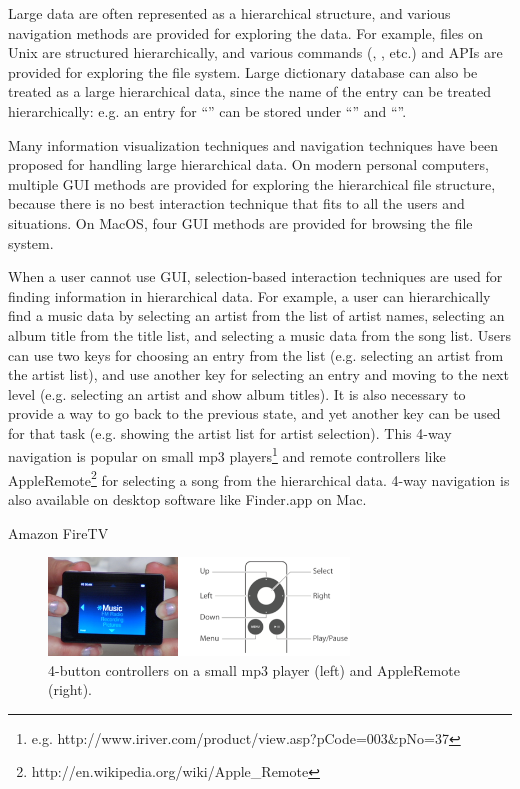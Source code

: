 \documentclass{article}
\begin{document}
Large data are often represented as a hierarchical structure, and
various navigation methods are provided for exploring the data.
For example, files on Unix are structured hierarchically, and
various commands (, , etc.) and APIs are provided for exploring the file system.
Large dictionary database can also be treated as a large
hierarchical data, since the name of the entry can be treated hierarchically:
e.g. an entry for ``'' can be stored under ``'' and ``''.

Many information visualization techniques and navigation techniques
have been proposed for handling large hierarchical data.
On modern personal computers,
multiple GUI methods are provided for
exploring the hierarchical file structure, because
there is no best interaction technique that fits to all the users and situations.
On MacOS, four GUI methods are provided for browsing the file system.


When a user cannot use GUI,
selection-based interaction techniques are used for
finding information in hierarchical data.
For example, a user can hierarchically find a music data by
selecting an artist from the list of artist names,
selecting an album title from the title list,
and selecting a music data from the song list.
Users can use two keys for choosing an entry from the list
(e.g. selecting an artist from the artist list),
and use another key for selecting an entry and moving to the next level
(e.g. selecting an artist and show album titles).
It is also necessary to provide a way to go back to the previous state, and
yet another key can be used for that task
(e.g. showing the artist list for artist selection).
This 4-way navigation is popular on small mp3 players\footnote{
  e.g. \textsf{http://www.iriver.com/product/view.asp?pCode=003\&pNo=37}
} and remote controllers like AppleRemote\footnote{\textsf{http://en.wikipedia.org/wiki/Apple\_Remote}}
for selecting a song from the hierarchical data.
4-way navigation is also available on desktop software like Finder.app on Mac.

Amazon FireTV

\begin{figure}[H]
\centerline{\includegraphics[width=80mm,bb=0 0 547 179]{figures/4buttons.png}}
\caption{4-button controllers on a small mp3 player (left) and AppleRemote (right).}
\label{u10}
\end{figure}
\end{document}
